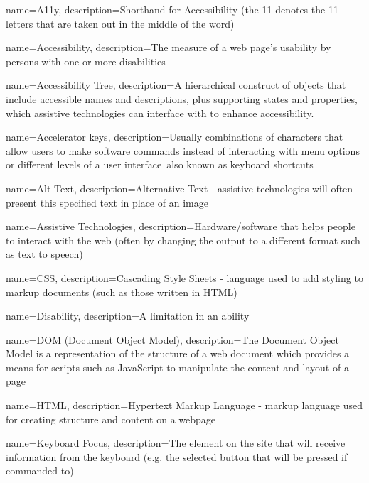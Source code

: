 {
    name=A11y,
    description={Shorthand for Accessibility (the 11 denotes the 11 letters that are taken out in the middle of the word)}
}

{
    name=Accessibility,
    description=The measure of a web page's usability by persons with one or more disabilities
}

{
    name=Accessibility Tree,
    description=A hierarchical construct of objects that include accessible names and descriptions, plus supporting states and properties, which assistive technologies can interface with to enhance accessibility.
}

{
    name=Accelerator keys,
    description=Usually combinations of characters that allow users to make software commands instead of interacting with menu options or different levels of a user interface\, also known as keyboard shortcuts
}

{
    name=Alt-Text,
    description={Alternative Text - assistive technologies will often present this specified text in place of an image}
}

{
    name=Assistive Technologies,
    description={Hardware/software that helps people to interact with the web (often by changing the output to a different format such as text to speech)}
}

{
    name=CSS,
    description=Cascading Style Sheets - language used to add styling to markup documents (such as those written in HTML)
}

{
    name=Disability,
    description=A limitation in an ability
}

{
    name=DOM (Document Object Model),
    description=The Document Object Model is a representation of the structure of a web document which provides a means for scripts such as JavaScript to manipulate the content and layout of a page
}

{
    name=HTML,
    description=Hypertext Markup Language - markup language used for creating structure and content on a webpage
}

{
    name=Keyboard Focus,
    description=The element on the site that will receive information from the keyboard (e.g. the selected button that will be pressed if commanded to)
}

